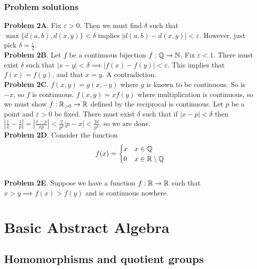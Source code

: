 \documentclass[11pt]{scrreport}
\begin{document}
\section{Problem solutions}
\textbf{Problem 2A}. Fix $\varepsilon>0$. Then we must find $\delta$ such that $\max\{d(a,b),d(x,y)\}<\delta$ implies $|d(a,b)-d(x,y)|<\varepsilon$. However, just pick $\delta=\frac{\varepsilon}{2}$.\\
\textbf{Problem 2B}. Let $f$ be a continuous bijection $f:\mathbb Q\to\mathbb N$. Fix $\varepsilon < 1$. There must exist $\delta$ such that $|x-y|<\delta\implies |f(x)-f(y)|<\varepsilon$. This implies that $f(x)=f(y)$, and that $x=y$. A contradiction.\\
\textbf{Problem 2C}. $f(x,y) = g(x,-y)$ where $g$ is known to be continuous. So is $-x$, so $f$ is continuous. $f(x,y)=xf(y)$ where multiplication is continuous, so we must show $f: \mathbb R_{>0}\to\mathbb R$ defined by the reciprocal is continuous. Let $p$ be a point and $\varepsilon>0$ be fixed. There must exist $\delta$ such that if $|x-p|< \delta$ then $|\frac{1}{x}-\frac{1}{p}|=|\frac{x-p}{xp}|<\frac{2}{p^2}|p-x|<\frac{2\delta}{p^2}$, so we are done.\\
\textbf{Problem 2D}. Consider the function \[f(x)=\begin{cases}
    x & x\in \mathbb Q \\
    0 & x\in \mathbb R \setminus \mathbb Q
\end{cases}\]\\
\textbf{Problem 2E}. Suppose we have a function $f:\mathbb R\to\mathbb R$ such that $x>y\implies f(x)>f(y)$ and is continuous nowhere.

\part{Basic Abstract Algebra}
\chapter{Homomorphisms and quotient groups}
\end{document}
